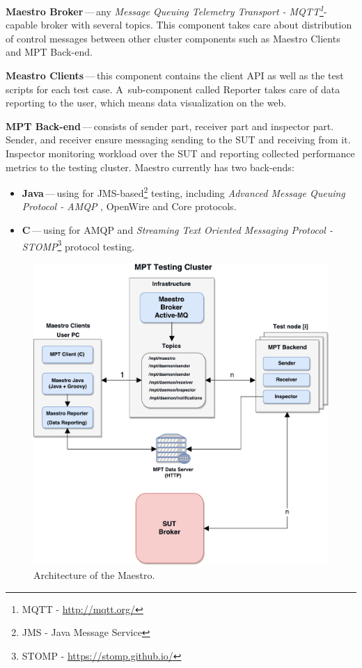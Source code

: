 \begin{description}
	\setlength\itemsep{0em}
	\item \textbf{Maestro Broker}\,---\,any \emph{Message Queuing Telemetry Transport - MQTT\footnote{MQTT - \url{http://mqtt.org/}}}-capable broker with several topics. This component takes care about distribution of control messages between other cluster components such as Maestro Clients and MPT Back-end. 
	\item \textbf{Meastro Clients}\,---\,this component contains the client API as well as the test scripts for each test case. A~sub-component called Reporter takes care of data reporting to the user, which means data visualization on the web.
	\item \textbf{MPT Back-end}\,---\,consists of sender part, receiver part and inspector part. Sender, and receiver ensure messaging sending to the SUT and receiving from it. Inspector monitoring workload over the SUT and reporting collected performance metrics to the testing cluster. Maestro currently has two back-ends:
	\begin{itemize}
		\item \textbf{Java}\,---\,using for JMS-based\footnote{JMS - Java Message Service} testing, including \emph{Advanced Message Queuing Protocol - AMQP} \cite{OASIS:AMQP}, OpenWire and Core protocols.
		\item \textbf{C}\,---\,using for AMQP and \emph{Streaming Text Oriented Messaging Protocol - STOMP}\footnote{STOMP - \url{https://stomp.github.io/}} protocol testing.
	\end{itemize}
\end{description}

\begin{figure}[H]
  \centering
  \includegraphics[width=15cm]{obrazky-figures/msg_perf_tool.pdf}
  \caption{Architecture of the Maestro.}
  \label{fig:msg_perf_tool}
\end{figure}

